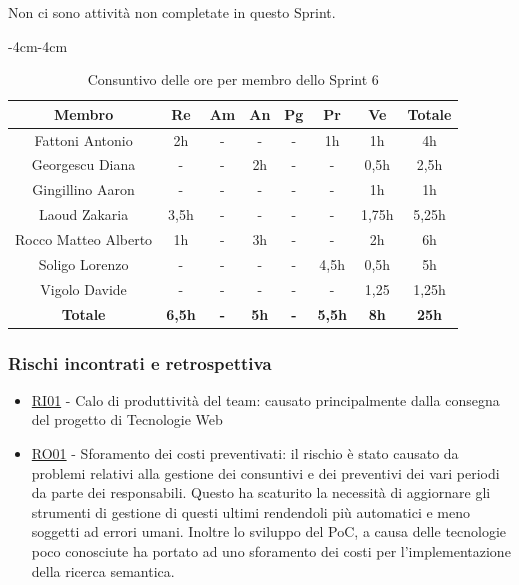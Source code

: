 \documentclass[a4paper,12pt]{article}
\begin{document}
Non ci sono attività non completate in questo Sprint.

\begin{table}[H]
    \begin{adjustwidth}{-4cm}{-4cm}
    \centering
    \begin{tabular}{|c|c|c|c|c|c|c|c|}
        \hline
        \textbf{Membro}& \textbf{Re} & \textbf{Am} & \textbf{An} & \textbf{Pg} & \textbf{Pr} & \textbf{Ve} & \textbf{Totale} \\
        \hline
        Fattoni Antonio & 2h & - & - & - & 1h & 1h & 4h \\
        \hline
        Georgescu Diana & - & - & 2h & - & - & 0,5h & 2,5h \\
        \hline
        Gingillino Aaron & - & - & - & - & - & 1h & 1h \\
        \hline
        Laoud Zakaria & 3,5h & - & - & - & - & 1,75h & 5,25h \\
        \hline
        Rocco Matteo Alberto & 1h & - & 3h & - & - & 2h & 6h \\
        \hline
        Soligo Lorenzo & - & - & - & - & 4,5h & 0,5h & 5h \\
        \hline
        Vigolo Davide & - & - & - & - & - & 1,25 & 1,25h \\
        \hline
        \textbf{Totale} & \textbf{6,5h} & \textbf{-} & \textbf{5h} & \textbf{-} & \textbf{5,5h} & \textbf{8h} & \textbf{25h} \\
        \hline
    \end{tabular}
    \caption{Consuntivo delle ore per membro dello Sprint 6}
    \end{adjustwidth}
\end{table}

\subsubsection{Rischi incontrati e retrospettiva}
\begin{itemize}
    \item \hyperref[RI01]{RI01} - Calo di produttività del team: causato principalmente dalla consegna del progetto di Tecnologie Web
    \item \hyperref[RO01]{RO01} - Sforamento dei costi preventivati: il rischio è stato causato da problemi relativi alla gestione dei consuntivi e dei preventivi dei vari periodi da parte dei responsabili. Questo ha scaturito la necessità di aggiornare gli strumenti di gestione di questi ultimi rendendoli più automatici e meno soggetti ad errori umani. Inoltre lo sviluppo del PoC, a causa delle tecnologie poco conosciute ha portato ad uno sforamento dei costi per l'implementazione della ricerca semantica.
\end{itemize}
\end{document}
